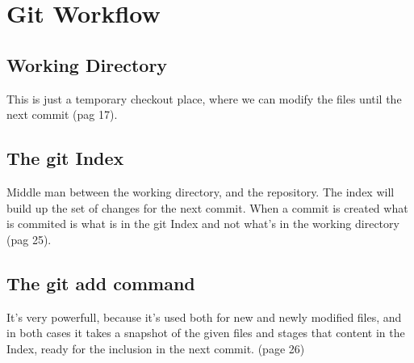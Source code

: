 \section{Git Workflow}

\subsection{Working Directory}

This is just a temporary checkout place, where we can modify 
the files until the next commit \cite{gitComm} (pag 17).

\subsection{The git Index}

Middle man between the working directory, and the repository.
The index will build up the set of changes for the next
commit. When a commit is created what is commited is what
is in the git Index and not what's in the working directory \cite{gitComm} (pag 25).

\subsection{The git add command}

It's very powerfull, because it's used both for new and newly modified
files, and in both cases it takes a snapshot of the given files
and stages that content in the Index, ready for the inclusion
in the next commit. \cite{gitComm} (page 26) 

